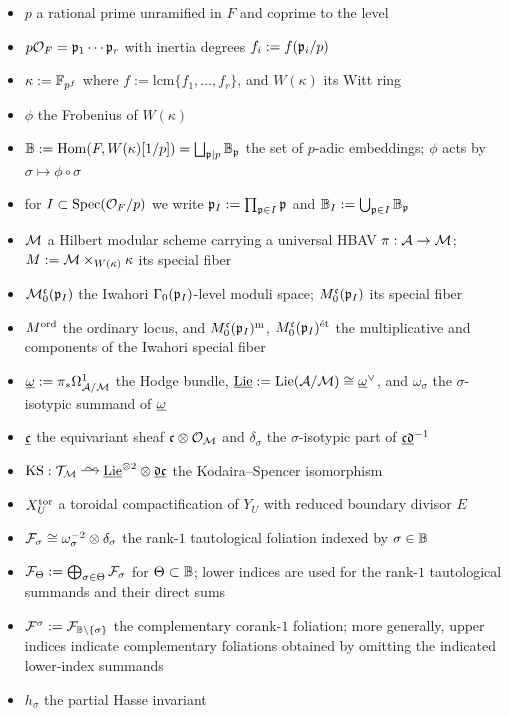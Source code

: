 \documentclass[main.tex]{subfiles}
\begin{document}
\begin{itemize}
\item $p$ a rational prime unramified in $F$ and coprime to the level
\item $p\mathcal{O}_F = \mathfrak{p}_1 \cdots \mathfrak{p}_r$ with inertia degrees $f_i := f(\mathfrak{p}_i/p)$
\item $\kappa := \mathbb{F}_{p^f}$ where $f := \mathrm{lcm}\{f_1,\dots,f_r\}$, and $W(\kappa)$ its Witt ring
\item $\phi$ the Frobenius of $W(\kappa)$
\item $\mathbb{B} := \operatorname{\mathrm{Hom}}(F, W(\kappa)[1/p]) = \bigsqcup_{\mathfrak{p} \mid p} \mathbb{B}_{\mathfrak{p}}$ the set of $p$-adic embeddings; $\phi$ acts by $\sigma \mapsto \phi \circ \sigma$
\item for $I \subset \operatorname{\mathrm{Spec}}(\mathcal{O}_F/p)$ we write $\mathfrak{p}_I := \prod_{\mathfrak{p} \in I} \mathfrak{p}$ and $\mathbb{B}_I := \bigcup_{\mathfrak{p} \in I} \mathbb{B}_{\mathfrak{p}}$
\item $\mathcal{M}$ a Hilbert modular scheme carrying a universal HBAV $\pi : \mathcal{A} \to \mathcal{M}$; $M := \mathcal{M} \times_{W(\kappa)} \kappa$ its special fiber
\item $\mathcal{M}_0^{\mathfrak{c}}(\mathfrak{p}_I)$ the Iwahori $\Gamma_0(\mathfrak{p}_I)$-level moduli space; $M_0^{\mathfrak{c}}(\mathfrak{p}_I)$ its special fiber
\item $M^{\operatorname{\mathrm{ord}}}$ the ordinary locus, and $M_0^{\mathfrak{c}}(\mathfrak{p}_I)^{\mathrm{m}}$, $M_0^{\mathfrak{c}}(\mathfrak{p}_I)^{\mathrm{\acute{e}t}}$ the multiplicative and \etale components of the Iwahori special fiber
\item $\underline{\omega} := \pi_* \Omega^1_{\mathcal{A}/\mathcal{M}}$ the Hodge bundle, $\underline{\mathrm{Lie}} := \mathrm{Lie}(\mathcal{A}/\mathcal{M}) \cong \underline{\omega}^{\vee}$, and $\omega_{\sigma}$ the $\sigma$-isotypic summand of $\underline{\omega}$
\item $\underline{\mathfrak{c}}$ the equivariant sheaf $\mathfrak{c} \otimes \mathcal{O}_{\mathcal{M}}$ and $\delta_{\sigma}$ the $\sigma$-isotypic part of $\underline{\mathfrak{c}\mathfrak{d}}^{-1}$
\item $\KS : \T_{\cM} \iso \ul{\Lie}^{\ot 2} \ot \ul{\dd\cc}$ the Kodaira--Spencer isomorphism
\item $X_U^{\mathrm{tor}}$ a toroidal compactification of $Y_U$ with reduced boundary divisor $E$
\item $\mathcal{F}_{\sigma} \cong \omega_{\sigma}^{-2} \otimes \delta_{\sigma}$ the rank-$1$ tautological foliation indexed by $\sigma \in \mathbb{B}$
\item $\mathcal{F}_{\Theta} := \bigoplus_{\sigma \in \Theta} \mathcal{F}_{\sigma}$ for $\Theta \subset \mathbb{B}$; lower indices are used for the rank-$1$ tautological summands and their direct sums
\item $\mathcal{F}^{\sigma} := \mathcal{F}_{\mathbb{B} \setminus \{\sigma\}}$ the complementary corank-$1$ foliation; more generally, upper indices indicate complementary foliations obtained by omitting the indicated lower-index summands
\item $h_{\sigma}$ the partial Hasse invariant
\end{itemize}


\ifSubfilesClassLoaded{%
  
  
}{}
\end{document}

